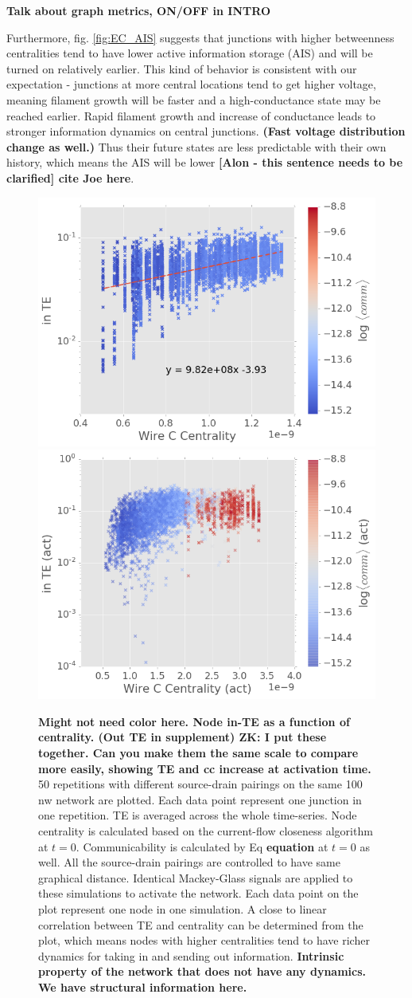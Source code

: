 \documentclass[fleqn,10pt,  amsmath,amssymb,aps]{wlscirep}
\begin{document}
\textbf{Talk about graph metrics, ON/OFF in INTRO}

Furthermore, fig. \ref{fig:EC_AIS} suggests that junctions with higher betweenness centralities tend to have lower active information storage (AIS) and will be turned on relatively earlier. This kind of behavior is consistent with our expectation - junctions at more central locations tend to get higher voltage, meaning filament growth will be faster and a high-conductance state may be reached earlier. Rapid filament growth and increase of conductance leads to stronger information dynamics on central junctions. \textbf{(Fast voltage distribution change as well.)} Thus their future states are less predictable with their own history, which means the AIS will be lower \textbf{[Alon - this sentence needs to be clarified] cite Joe here}.

\begin{figure}[h]
	\centering
	\includegraphics[width=0.45\linewidth]{figure/in_TE}
	\includegraphics[width=0.45\linewidth]{figure/TE_cent_act}
	\caption{\textbf{Might not need color here. Node in-TE as a function of centrality. (Out TE in  supplement) ZK: I put these together. Can you make them the same scale to compare more easily, showing TE and cc increase at activation time.} 50 repetitions with different source-drain pairings on the same 100 nw network are plotted. Each data point represent one junction in one repetition. TE is averaged across the whole time-series. Node centrality is calculated based on the current-flow closeness algorithm at $t = 0$. Communicability is calculated by Eq \textbf{equation} at $t = 0$ as well. All the source-drain pairings are controlled to have same graphical distance. Identical Mackey-Glass signals are applied to these simulations to activate the network. Each data point on the plot represent one node in one simulation. A close to linear correlation between TE and centrality can be determined from the plot, which means nodes with higher centralities tend to have richer dynamics for taking in and sending out information.
	\textbf{Intrinsic property of the network that does not have any dynamics. We have structural information here.}}
	\label{fig:in_te}
\end{figure}
\end{document}
